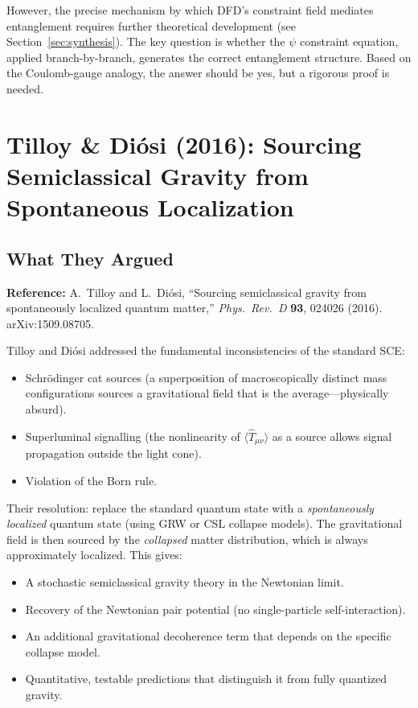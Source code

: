 \documentclass[12pt,a4paper]{article}
\begin{document}
However, the precise mechanism by which DFD's constraint field mediates entanglement requires further theoretical development (see Section~\ref{sec:synthesis}). The key question is whether the $\psi$ constraint equation, applied branch-by-branch, generates the correct entanglement structure. Based on the Coulomb-gauge analogy, the answer should be yes, but a rigorous proof is needed.


\section{Tilloy \& Di\'osi (2016): Sourcing Semiclassical Gravity from Spontaneous Localization}
\label{sec:tilloy-diosi}

\subsection{What They Argued}

\textbf{Reference:} A.\ Tilloy and L.\ Di\'osi, ``Sourcing semiclassical gravity from spontaneously localized quantum matter,'' \textit{Phys.\ Rev.\ D} \textbf{93}, 024026 (2016). arXiv:1509.08705.

Tilloy and Di\'osi addressed the fundamental inconsistencies of the standard SCE:
\begin{itemize}
\item Schr\"odinger cat sources (a superposition of macroscopically distinct mass configurations sources a gravitational field that is the average---physically absurd).
\item Superluminal signalling (the nonlinearity of $\langle\hat{T}_{\mu\nu}\rangle$ as a source allows signal propagation outside the light cone).
\item Violation of the Born rule.
\end{itemize}

Their resolution: replace the standard quantum state with a \emph{spontaneously localized} quantum state (using GRW or CSL collapse models). The gravitational field is then sourced by the \emph{collapsed} matter distribution, which is always approximately localized. This gives:
\begin{itemize}
\item A stochastic semiclassical gravity theory in the Newtonian limit.
\item Recovery of the Newtonian pair potential (no single-particle self-interaction).
\item An additional gravitational decoherence term that depends on the specific collapse model.
\item Quantitative, testable predictions that distinguish it from fully quantized gravity.
\end{itemize}
\end{document}
